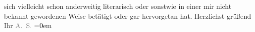 \begin{ledgroupsized}[t]{13cm}
               sich vielleicht schon anderweitig literarisch oder sonstwie in einer mir nicht
               bekannt gewordenen Weise betätigt oder gar hervorgetan hat.\pend
           \pstart
           Herzlichst grüßend{\\[\baselineskip]}Ihr \spacefill\mbox{\textcolor{gray}{A. S.}}\pend
           \leftskip=0em{}\endnumbering{}\end{ledgroupsized}  \newcommand{\dateiname}{L02256}\newcommand{\titel}{Arthur Schnitzler an Hugo von Hofmannsthal, 19. 2. 1917}\newcommand{\editorInnen}{Martin Anton Müller und Gerd-Hermann Susen}
            \footnotesize
\begin{ledgroupsized}[t]{11.5cm}
\end{ledgroupsized}
         
      